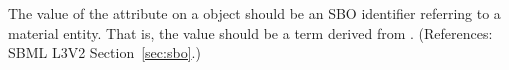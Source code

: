 The value of the attribute  on a \Compartment object should
be an SBO identifier referring to a material entity.  That is, the value
should be a term derived from \sbomaterialentity.  (References: SBML L3V2
Section~\ref{sec:sbo}.)
